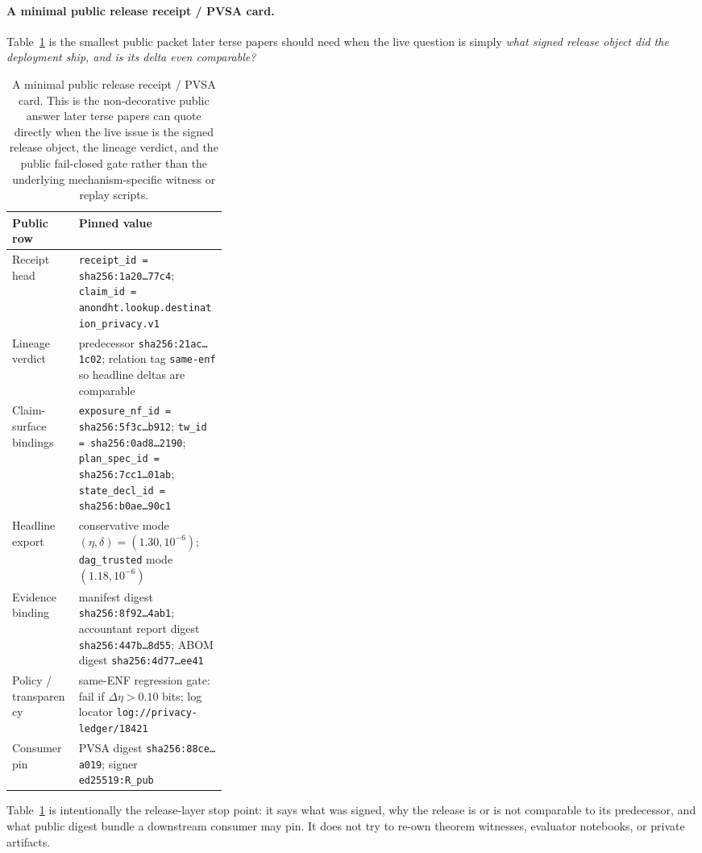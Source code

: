 \documentclass[11pt]{article}
\begin{document}
\paragraph{A minimal public release receipt / PVSA card.}
Table~\ref{tab:minimal-release-card} is the smallest public packet later terse papers should need when the live question is simply \emph{what signed release object did the deployment ship, and is its delta even comparable?}

\begin{table}[t]
\centering
\small
\begin{tabularx}{0.97\linewidth}{@{}p{0.31\linewidth}X@{}}
\toprule
\textbf{Public row} & \textbf{Pinned value}\\
\midrule
Receipt head & \texttt{receipt\_id = sha256:1a20\ldots 77c4}; \texttt{claim\_id = anondht.lookup.destination\_privacy.v1} \\
Lineage verdict & predecessor \texttt{sha256:21ac\ldots 1c02}; relation tag \texttt{same-enf} so headline deltas are comparable \\
Claim-surface bindings & \texttt{exposure\_nf\_id = sha256:5f3c\ldots b912}; \texttt{tw\_id = sha256:0ad8\ldots 2190}; \texttt{plan\_spec\_id = sha256:7cc1\ldots 01ab}; \texttt{state\_decl\_id = sha256:b0ae\ldots 90c1} \\
Headline export & conservative mode \((\eta,\delta)=(1.30,10^{-6})\); \texttt{dag\_trusted} mode \((1.18,10^{-6})\) \\
Evidence binding & manifest digest \texttt{sha256:8f92\ldots 4ab1}; accountant report digest \texttt{sha256:447b\ldots 8d55}; ABOM digest \texttt{sha256:4d77\ldots ee41} \\
Policy / transparency & same-ENF regression gate: fail if \(\Delta\eta > 0.10\) bits; log locator \texttt{log://privacy-ledger/18421} \\
Consumer pin & PVSA digest \texttt{sha256:88ce\ldots a019}; signer \texttt{ed25519:R\_pub} \\
\bottomrule
\end{tabularx}
\caption{A minimal public release receipt / PVSA card. This is the non-decorative public answer later terse papers can quote directly when the live issue is the signed release object, the lineage verdict, and the public fail-closed gate rather than the underlying mechanism-specific witness or replay scripts.}
\label{tab:minimal-release-card}
\end{table}

Table~\ref{tab:minimal-release-card} is intentionally the release-layer stop point: it says what was signed, why the release is or is not comparable to its predecessor, and what public digest bundle a downstream consumer may pin. It does not try to re-own theorem witnesses, evaluator notebooks, or private artifacts.
\end{document}
